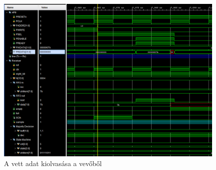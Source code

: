 \begin{figure}[h]
\vspace{0.5cm}
\begin{center}
\includegraphics[width=\textwidth]{figures/sim2.png}
\caption{A vett adat kiolvasása a vevőből}
\label{fig:sim2}
\end{center}
\vspace{0.5cm}
\end{figure}